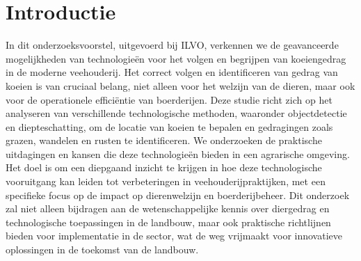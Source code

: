 
\section{Introductie}%
\label{sec:introductie}

In dit onderzoeksvoorstel, uitgevoerd bij ILVO, verkennen we de geavanceerde mogelijkheden van technologieën voor het volgen en begrijpen van koeiengedrag in de moderne veehouderij. Het correct volgen en identificeren van gedrag van koeien is van cruciaal belang, niet alleen voor het welzijn van de dieren, maar ook voor de operationele efficiëntie van boerderijen. Deze studie richt zich op het analyseren van verschillende technologische methoden, waaronder objectdetectie en diepteschatting, om de locatie van koeien te bepalen en gedragingen zoals grazen, wandelen en rusten te identificeren. We onderzoeken de praktische uitdagingen en kansen die deze technologieën bieden in een agrarische omgeving. Het doel is om een diepgaand inzicht te krijgen in hoe deze technologische vooruitgang kan leiden tot verbeteringen in veehouderijpraktijken, met een specifieke focus op de impact op dierenwelzijn en boerderijbeheer. Dit onderzoek zal niet alleen bijdragen aan de wetenschappelijke kennis over diergedrag en technologische toepassingen in de landbouw, maar ook praktische richtlijnen bieden voor implementatie in de sector, wat de weg vrijmaakt voor innovatieve oplossingen in de toekomst van de landbouw.

